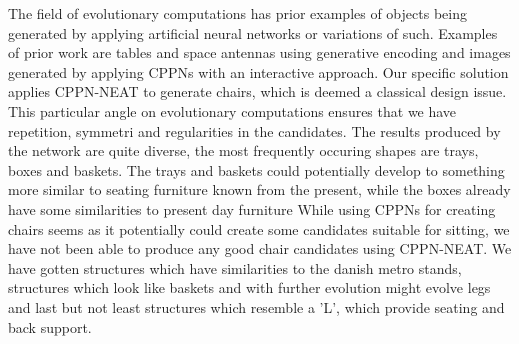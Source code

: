 The field of evolutionary computations has prior examples of objects being generated by applying artificial neural networks or variations of such.
Examples of prior work are tables and space antennas using generative encoding and images 
generated by applying CPPNs with an interactive approach.
Our specific solution applies CPPN-NEAT to generate chairs, which is deemed a classical design issue.
This particular angle on evolutionary computations ensures that we have repetition, symmetri and regularities in the candidates.
The results produced by the network are quite diverse, the most frequently occuring 
shapes are trays, boxes and baskets.
The trays and baskets could potentially develop to something more similar to seating furniture known 
from the present, while the boxes already have some similarities to present day furniture
While using CPPNs for creating chairs seems as it potentially could create some candidates suitable 
for sitting, we have not been able to produce any good chair candidates using CPPN-NEAT.
We have gotten structures which have similarities to the danish metro stands, structures which look like baskets and with further evolution might evolve legs and last but not least structures which resemble a 'L', which provide seating and back support.
